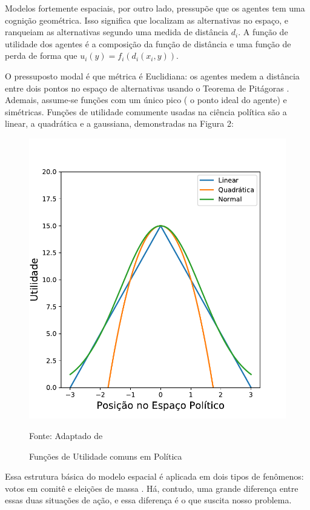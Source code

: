Modelos fortemente espaciais, por outro lado, pressupõe que os agentes tem uma
cognição geométrica. Isso significa que localizam as alternativas no espaço, e
ranqueiam as alternativas segundo uma medida de distância \(d_i\). A função de
utilidade dos agentes é a composição da função de distância e uma função de
perda de forma que \(u_i(y) = f_i(d_i(x_i,y)) \).

O pressuposto modal  é que métrica é Euclidiana: os agentes
medem a distância entre dois pontos no espaço de alternativas usando o Teorema
de Pitágoras \cite{munger2015choosing}. Ademais, assume-se funções com um único
pico ( o ponto ideal do agente) e simétricas. Funções de utilidade comumente
usadas na ciência política são a linear, a quadrática e a gaussiana,
demonstradas na Figura 2: 


\begin{figure}[H]
  \centering \includegraphics[scale = 0.8]{ims/utilities.pdf}
  \caption{Funções de Utilidade comuns em Política}
  Fonte: Adaptado de 
\end{figure}

Essa estrutura básica do modelo espacial é aplicada em dois tipos de fenômenos:
votos em comitê e eleições de massa \cite{munger2015choosing}. Há, contudo, uma
grande diferença entre essas duas situações de ação, e essa diferença é o que
suscita nosso problema.


